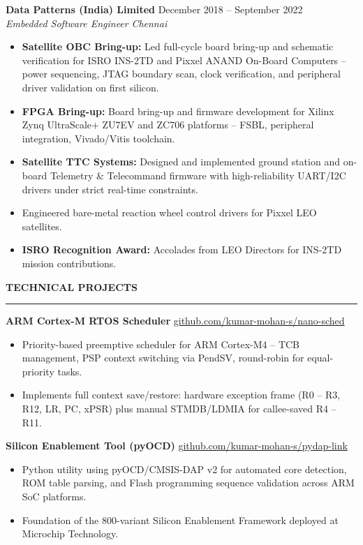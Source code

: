 \documentclass[11pt,a4paper]{article}
\newcommand{\resumesection}[1]{
    \vspace{1.2em} 
    {\large \textbf{\uppercase{#1}}}
    \vspace{0.2em}
    \hrule
    \vspace{0.6em} 
}
\newcommand{\jobrole}[4]{
    \noindent
    \textbf{#1} \hfill #3 \\ 
    \textit{#4} \hfill \textit{#2}
    \vspace{0.3em} 
}
\newenvironment{achievements}{
    \begin{itemize}[leftmargin=1.5em, itemsep=4pt, topsep=2pt, parsep=0pt]
}{
    \end{itemize}
    \vspace{0.6em} 
}
\begin{document}
\jobrole{Data Patterns (India) Limited}{Chennai}{December 2018 -- September 2022}{Embedded Software Engineer}
\begin{achievements}
    \item \textbf{Satellite OBC Bring-up:} Led full-cycle board bring-up and schematic verification for ISRO INS-2TD and Pixxel ANAND On-Board Computers -- power sequencing, JTAG boundary scan, clock verification, and peripheral driver validation on first silicon.
    \item \textbf{FPGA Bring-up:} Board bring-up and firmware development for Xilinx Zynq UltraScale+ ZU7EV and ZC706 platforms -- FSBL, peripheral integration, Vivado/Vitis toolchain.
    \item \textbf{Satellite TTC Systems:} Designed and implemented ground station and on-board Telemetry \& Telecommand firmware with high-reliability UART/I2C drivers under strict real-time constraints.
    \item Engineered bare-metal reaction wheel control drivers for Pixxel LEO satellites.
    \item \textbf{ISRO Recognition Award:} Accolades from LEO Directors for INS-2TD mission contributions.
\end{achievements}

\resumesection{Technical Projects}

\noindent
\textbf{ARM Cortex-M RTOS Scheduler} \hfill
\href{https://github.com/kumar-mohan-s/nano-sched}{github.com/kumar-mohan-s/nano-sched}
\begin{achievements}
    \item Priority-based preemptive scheduler for ARM Cortex-M4 -- TCB management, PSP context switching via PendSV, round-robin for equal-priority tasks.
    \item Implements full context save/restore: hardware exception frame (R0 -- R3, R12, LR, PC, xPSR) plus manual STMDB/LDMIA for callee-saved R4 -- R11.
\end{achievements}

\noindent
\textbf{Silicon Enablement Tool (pyOCD)} \hfill
\href{https://github.com/kumar-mohan-s/pydap-link}{github.com/kumar-mohan-s/pydap-link}
\begin{achievements}
    \item Python utility using pyOCD/CMSIS-DAP v2 for automated core detection, ROM table parsing, and Flash programming sequence validation across ARM SoC platforms.
    \item Foundation of the 800-variant Silicon Enablement Framework deployed at Microchip Technology.
\end{achievements}
\end{document}
